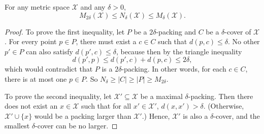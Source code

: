 \documentclass[thesis.tex]{subfiles}
\newcommand{\set}[1]{\mathcal {#1}}
\newcommand{\dist}[2]{\distf({#1},{#2})}
\newcommand{\distf}{d}
\newcommand{\minkdim}{\text{dim}_\textnormal{Mink}}
\begin{document}
\begin{lemma}
    \label{lemma:coverpacking}
    For any metric space $\set X$ and any $\delta>0$,
    \begin{equation}
        M_{2\delta}(\set X) \le N_\delta(\set X) \le M_{\delta}(\set X)
        .
    \end{equation}
\end{lemma}
\begin{proof}
    To prove the first inequality, let $P$ be a $2\delta$-packing and $C$ be a $\delta$-cover of $\set X$.
    For every point $p\in P$, there must exist a $c\in C$ such that $\dist{p}{c}\le\delta$.
    No other $p'\in P$ can also satisfy $\dist{p'}{c}\le\delta$, because then by the triangle inequality
    \begin{equation}
        \dist{p'}{p} \le \dist{p'}{c}+\dist{p}{c} \le 2\delta
        ,
    \end{equation}
    which would contradict that $P$ is a $2\delta$-packing.
    In other words, for each $c\in C$, there is at most one $p\in P$.
    So $N_\delta \ge |C| \ge |P| \ge M_{2\delta}$.

    To prove the second inequality, let $\set X'\subseteq \set X$ be a maximal $\delta$-packing.
    Then there does not exist an $x\in\set X$ such that for all $x'\in\set X'$, 
    $\dist{x}{x'} > \delta$.
    (Otherwise, $\set X' \cup \{x\}$ would be a packing larger than $\set X'$.)
    Hence, $\set X'$ is also a $\delta$-cover,
    and the smallest $\delta$-cover can be no larger.
\end{proof}

%

%
\end{document}
